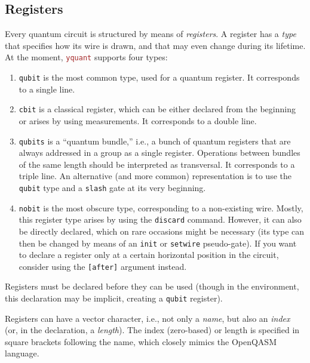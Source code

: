 \documentclass{scrartcl}
\def\pkg#1{\textcolor{brown}{\texttt{#1}}}
\def\ttlink{\link\texttt}
\def\texlink{\link\tex}
\def\Yquant{\pkg{yquant}}
\begin{document}
      \subsection{Registers}\label{sec:registers}
         Every quantum circuit is structured by means of \emph{registers}.
         A register has a \emph{type} that specifies how its wire is drawn, and that may even change during its lifetime.
         At the moment, \Yquant{} supports four types:
         \begin{enumerate}
            \item \ttlink{qubit} is the most common type, used for a quantum register.
               It corresponds to a single line.
            \item \ttlink{cbit} is a classical register, which can be either declared from the beginning or arises by using measurements.
               It corresponds to a double line.
            \item \ttlink{qubits} is a ``quantum bundle,'' i.e., a bunch of quantum registers that are always addressed in a group as a single register.
               Operations between bundles of the same length should be interpreted as transversal.
               It corresponds to a triple line.
               An alternative (and more common) representation is to use the \ttlink{qubit} type and a \ttlink{slash} gate at its very beginning.
            \item \ttlink{nobit} is the most obscure type, corresponding to a non\hyp existing wire.
               Mostly, this register type arises by using the \ttlink{discard} command.
               However, it can also be directly declared, which on rare occasions might be necessary (its type can then be changed by means of an \ttlink{init} or \ttlink{setwire} pseudo\hyp gate).
               If you want to declare a register only at a certain horizontal position in the circuit, consider using the \ttlink{[after]} argument instead.
         \end{enumerate}

         Registers must be declared before they can be used (though in the \texlink{yquant*} environment, this declaration may be implicit, creating a \ttlink{qubit} register).

         Registers can have a vector character, i.e., not only a \emph{name}, but also an \emph{index} (or, in the declaration, a \emph{length}).
         The index (zero\hyp based) or length is specified in square brackets following the name, which closely mimics the OpenQASM language.
\end{document}
